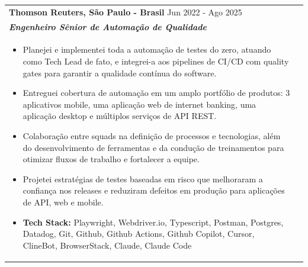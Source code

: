 \documentclass[a4paper,8pt]{article}
\begin{document}
\begin{tabularx}{\linewidth}{ @{}l r@{} }
\textbf{{Thomson Reuters, S\~ao Paulo - Brasil}} \hfill \color[HTML]{371e77} Jun 2022 - Ago 2025 \\[4pt]
\color[HTML]{371e77}\textbf{\textit{Engenheiro S\^enior de Automa\c{c}\~ao de Qualidade}}\ \hfill \color[HTML]{4B28A4} \\[5pt]
\begin{minipage}[t]{\linewidth}
    \begin{itemize}[nosep,after=\strut, leftmargin=2em, itemsep=2pt]
        \item Planejei e implementei toda a automa\c{c}\~ao de testes do zero, atuando como Tech Lead de fato, e integrei-a aos pipelines de CI/CD com quality gates para garantir a qualidade cont\'inua do software.
        \item Entreguei cobertura de automa\c{c}\~ao em um amplo portf\'olio de produtos: 3 aplicativos mobile, uma aplica\c{c}\~ao web de internet banking, uma aplica\c{c}\~ao desktop e m\'ultiplos servi\c{c}os de API REST.
        \item Colabora\c{c}\~ao entre squads na defini\c{c}\~ao de processos e tecnologias, al\'em do desenvolvimento de ferramentas e da condu\c{c}\~ao de treinamentos para otimizar fluxos de trabalho e fortalecer a equipe.
        \item Projetei estrat\'egias de testes baseadas em risco que melhoraram a confian\c{c}a nos releases e reduziram defeitos em produ\c{c}\~ao para aplica\c{c}\~oes de API, web e mobile.
        \item \textbf{Tech Stack:} Playwright, Webdriver.io, Typescript, Postman, Postgres, Datadog, Git, Github, Github Actions, Github Copilot, Cursor, ClineBot, BrowserStack, Claude, Claude Code
    \end{itemize}
\end{minipage}
\end{tabularx}
\end{document}
